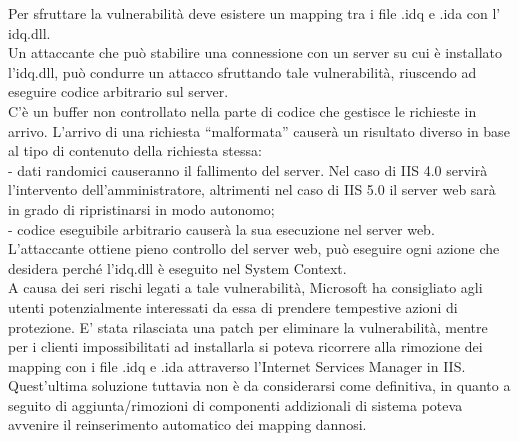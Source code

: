 Per sfruttare la vulnerabilità deve esistere un mapping tra i file .idq e .ida con l’ idq.dll.\\
Un attaccante che può stabilire una connessione con un server su cui è installato l’idq.dll, può condurre un attacco sfruttando tale vulnerabilità, riuscendo ad eseguire codice arbitrario sul server.\\
C’è un buffer non controllato nella parte di codice che gestisce le richieste in arrivo. L’arrivo di una richiesta “malformata” causerà un risultato diverso in base al tipo di contenuto della richiesta stessa:\\
- dati randomici causeranno il fallimento del server. Nel caso di IIS 4.0 servirà l’intervento dell’amministratore, altrimenti nel caso di IIS 5.0 il server web sarà in grado di ripristinarsi in modo autonomo;\\
- codice eseguibile arbitrario causerà la sua esecuzione nel server web.\\

L’attaccante ottiene pieno controllo del server web, può eseguire ogni azione che desidera perché l’idq.dll è eseguito nel System Context.\\

A causa dei seri rischi legati a tale vulnerabilità, Microsoft ha consigliato agli utenti potenzialmente interessati da essa di prendere tempestive azioni di protezione. E’ stata rilasciata una patch per eliminare la vulnerabilità, mentre per i clienti impossibilitati ad installarla si poteva ricorrere alla rimozione dei mapping con i file .idq e .ida attraverso l’Internet Services Manager in IIS. Quest’ultima soluzione tuttavia non è da considerarsi come definitiva, in quanto a seguito di aggiunta/rimozioni di componenti addizionali di sistema poteva avvenire il reinserimento automatico dei mapping dannosi.\\

